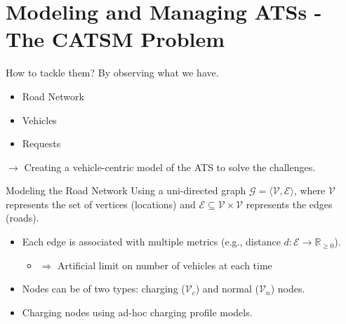 \section{Modeling and Managing ATSs - The CATSM Problem} 

\begin{frame}{How to tackle them?}
	By observing what we have. \\
	
	\vspace{0.5cm}
	\begin{itemize}
		\item Road Network
		\item Vehicles
		\item Requests
	\end{itemize}
	\vspace{0.5cm}
	$\rightarrow$ Creating a vehicle-centric model of the ATS to solve the challenges.
\end{frame}

\begin{frame}{Modeling the Road Network}
	Using a uni-directed graph $\mathcal{G} = \langle \mathcal{V}, \mathcal{E} \rangle$, where $\mathcal{V}$ represents the set of vertices (locations) and $\mathcal{E} \subseteq \mathcal{V} \times \mathcal{V}$ represents the edges (roads).
	\vspace{0.5cm}
	\begin{itemize}
		\item Each edge is associated with multiple metrics (e.g., distance $d: \mathcal{E} \rightarrow \mathbb{R}_{\geq 0}$).
		\begin{itemize}
			\item[ ] $\Rightarrow$ Artificial limit on number of vehicles at each time
		\end{itemize}
		\item Nodes can be of two types: charging ($\mathcal{V}_c$) and normal ($\mathcal{V}_n$) nodes.
		\item Charging nodes using ad-hoc charging profile models.
	\end{itemize}
\end{frame}



%	

